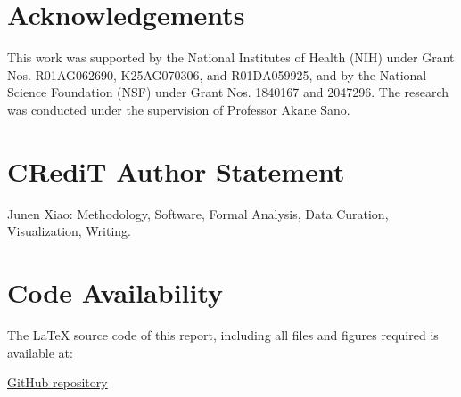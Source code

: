 \documentclass[letterpaper, 10 pt, conference]{ieeeconf}  %
\begin{document}
\section*{Acknowledgements}
This work was supported by the National Institutes of Health (NIH) under Grant Nos. R01AG062690, K25AG070306, and R01DA059925, and by the National Science Foundation (NSF) under Grant Nos. 1840167 and 2047296. The research was conducted under the supervision of Professor Akane Sano.

\section*{CRediT Author Statement}
Junen Xiao: Methodology, Software, Formal Analysis, Data Curation, Visualization, Writing.

\section*{Code Availability}
The LaTeX source code of this report, including all files and figures required is available at:

\href{https://github.com/PepperJess99/ELEC-594/tree/main/Midterm%20Report}{GitHub repository}

\addtolength{\textheight}{-12cm}   %





\newpage



\end{document}
